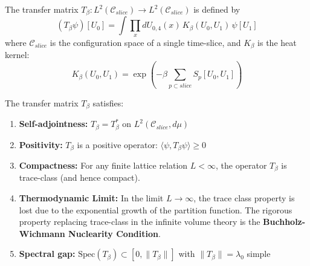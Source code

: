 \begin{definition}
The transfer matrix $T_\beta: L^2(\mathcal{C}_{slice}) \to L^2(\mathcal{C}_{slice})$ is defined by
\begin{equation}
    (T_\beta \psi)[U_0] = \int \prod_{x} dU_{0,4}(x) \, K_\beta(U_0, U_1) \, \psi[U_1]
\end{equation}
where $\mathcal{C}_{slice}$ is the configuration space of a single time-slice, and $K_\beta$ is the heat kernel:
\begin{equation}
    K_\beta(U_0, U_1) = \exp\left(-\beta \sum_{p \subset slice} S_p[U_0, U_1]\right)
\end{equation}
\end{definition}

\begin{theorem}\label{thm:transfer-properties}
The transfer matrix $T_\beta$ satisfies:
\begin{enumerate}
    \item \textbf{Self-adjointness:} $T_\beta = T_\beta^*$ on $L^2(\mathcal{C}_{slice}, d\mu)$
    \item \textbf{Positivity:} $T_\beta$ is a positive operator: $\langle \psi, T_\beta \psi \rangle \geq 0$
    \item \textbf{Compactness:} For any finite lattice relation $L < \infty$, the operator $T_\beta$ is trace-class (and hence compact).
    \item \textbf{Thermodynamic Limit:} In the limit $L \to \infty$, the trace class property is lost due to the exponential growth of the partition function. The rigorous property replacing trace-class in the infinite volume theory is the \textbf{Buchholz-Wichmann Nuclearity Condition}.
    \item \textbf{Spectral gap:} $\text{Spec}(T_\beta) \subset [0, \|T_\beta\|]$ with $\|T_\beta\| = \lambda_0$ simple
\end{enumerate}
\end{theorem}

